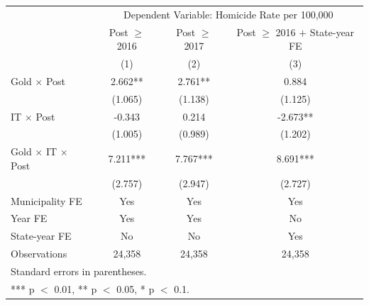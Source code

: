 
{\fontsize{7}{8}\selectfont
\begin{tabular}{lccc}
\toprule
& \multicolumn{3}{c}{Dependent Variable: Homicide Rate per 100,000} \\
\cmidrule(lr){2-4}
& Post $\geq$ 2016 & Post $\geq$ 2017 & \makecell{Post $\geq$ 2016 $+$ \\ State-year FE} \\
& (1) & (2) & (3) \\
\midrule
Gold $\times$ Post & 2.662** & 2.761** & 0.884 \\ 
& (1.065) & (1.138) & (1.125) \\
IT $\times$ Post & -0.343 & 0.214 & -2.673** \\
& (1.005) & (0.989) & (1.202) \\
Gold $\times$ IT $\times$ Post & 7.211*** & 7.767*** & 8.691*** \\
 & (2.757) & (2.947) & (2.727) \\
\midrule
Municipality FE & Yes & Yes & Yes \\
Year FE & Yes & Yes & No \\
State-year FE & No & No & Yes \\
Observations & 24,358 & 24,358 & 24,358 \\
\midrule
\multicolumn{4}{l}{ Standard errors in parentheses.} \\
\multicolumn{4}{l}{ *** p $<$ 0.01, ** p $<$ 0.05, * p $<$ 0.1.} \\
\bottomrule
\end{tabular}
}